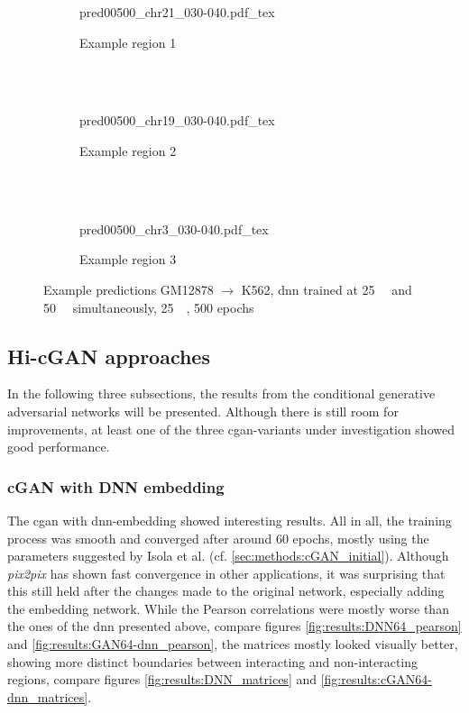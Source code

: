 \begin{figure}[p] %
    \begin{subfigure}{\textwidth}
        \centering
        \scriptsize
        {pred00500_chr21_030-040.pdf_tex}
        \caption{Example  region 1} \label{fig:results:25plus50_r1}
    \end{subfigure}\\[2mm]
    \\[3mm]
    \begin{subfigure}{\textwidth}
        \centering
        \scriptsize
        {pred00500_chr19_030-040.pdf_tex}
        \caption{Example region 2} \label{fig:results:25plus50_r2}
    \end{subfigure}\\[2mm]
    \\[3mm]
    \begin{subfigure}{\textwidth}
        \centering
        \scriptsize
        {pred00500_chr3_030-040.pdf_tex}
        \caption{Example region 3} \label{fig:results:25plus50_r3}
    \end{subfigure}
    \caption{Example predictions GM12878 $\rightarrow$ K562, \acrshort{dnn} trained at \SI{25}{\kilo\bp} and \SI{50}{\kilo\bp} simultaneously, \SI{25}{\kilo\bp}, 500 epochs}\label{fig:results:25plus50_matrices}
\end{figure}

\clearpage
\subsection{Hi-cGAN approaches} \label{sec:results:cgan}
In the following three subsections, the results from the conditional generative adversarial networks will be presented.
Although there is still room for improvements, at least one of the three \acrshort{cgan}-variants under investigation showed good performance. 

\subsubsection{cGAN with DNN embedding} \label{sec:results:cgan_dnn}
The \acrshort{cgan} with \acrshort{dnn}-embedding showed interesting results.
All in all, the training process was smooth and converged after around 60 epochs, mostly using the parameters suggested
by Isola et al. \cite{Isola2017} (cf. \ref{sec:methods:cGAN_initial}). 
Although \emph{pix2pix} has shown fast convergence in other applications, 
it was surprising that this still held after the changes made to the original network, especially adding the embedding network. 
While the Pearson correlations were mostly worse than the ones of the \acrshort{dnn} presented above, compare figures \ref{fig:results:DNN64_pearson} and \ref{fig:results:GAN64-dnn_pearson},
the matrices mostly looked visually better, showing more distinct boundaries between interacting and non-interacting regions, compare figures \ref{fig:results:DNN_matrices} and \ref{fig:results:cGAN64-dnn_matrices}.

